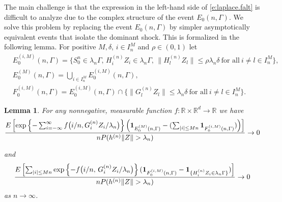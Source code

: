 \documentclass[11pt,reqno]{amsart}
\numberwithin{equation}{section}
\newtheorem{lemma}{Lemma}[section] %
\theoremstyle{definition}
\theoremstyle{remark}
\theoremstyle{definition}
\newcommand{\RR}{\mathbb{R}}
\newcommand{\one}{{\bf 1}}
\begin{document}
The main challenge is that the expression in the left-hand side of
\eqref{e:laplace.falt} is difficult to analyze due to the complex
structure of the event $E_0(n, \Gamma)$. We solve this problem by
replacing the event $E_0(n, \Gamma)$ by simpler asymptotically
equivalent events that isolate the dominant shock. This 
is formalized in the following lemma. For positive $M,\delta$, $i\in
I_n^M$ and $\rho \in (0, 1)$ let 
\begin{equation}\label{def:pt_decom}
    \begin{aligned}
    & E_0^{(i,M)}(n, \Gamma) = \bigl\{S_0^n\in\lambda_n\Gamma, \,
{H_i^{(n)}}  Z_i \in \lambda_n \Gamma, \, \|{H_{l}^{(n)}}Z_l\|\leq \rho \lambda_n\delta \ \text{for 
  all} \ i\neq l \in I_n^M \bigr\}, \\
  &E_0^{(M)}(n, \Gamma) = \bigcup_{i\in I_n^M} E_0^{(i,M)}(n, \Gamma),\\
  & F_0^{(i,M)}(n, \Gamma) = E_0^{(i,M)}(n, \Gamma)\cap
  \bigl\{\|G_l^{(n)}Z_l\| \leq \lambda_n  \delta \ \text{for all} \ i \neq l \in I_n^M\bigr\}.    \end{aligned}
\end{equation}

\begin{lemma}\label{l:pt_process_small}
For any  nonnegative, measurable function $f: \RR\times \RR^d \to \RR$
we have 
\begin{equation}\label{eq:pt_decomp1}
\frac{E\left[\exp\left\{ -\sum_{i=-\infty}^\infty  f\big(i/n, G_i^{(n)}
  Z_i/\lambda_n\big)\right\} \left(\one_{E_0^{(M)}(n,\Gamma)} - (\sum_{|i|\leq Mn}\one_{F_0^{(i,M)}(n,\Gamma)})\right)\right]}
{n P(h^{(n)}\|Z\|>\lambda_n)} \to 0
\end{equation}

and 
\begin{equation}\label{eq:pt_decomp2}
    \begin{aligned}
         \frac{E\left[\sum_{|i|\leq Mn}\exp\left\{ -   f\big(i/n, \, G_i^{(n)}
  Z_i/\lambda_n\big)\right\} (\one_{F_0^{(i, M)}(n, \Gamma)} -\one_{\{H_i^{(n)}Z_i \in \lambda_n \Gamma\}})\right]}{nP(h^{(n)}\|Z\| > \lambda_n)} \to 0
    \end{aligned}
  \end{equation}
  as $n\to\infty$. 
\end{lemma}
\end{document}
